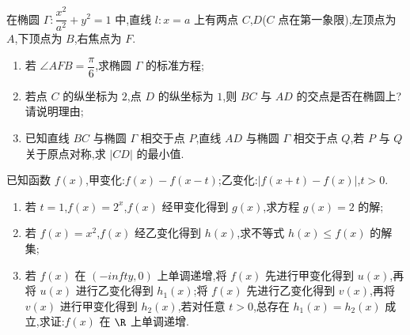 \begin{problem}
在椭圆 \(\Gamma:\dfrac{x^2}{a^2}+y^2=1\) 中,直线 \(l:x=a\) 上有两点 \(C\),\(D\)(\(C\) 点在第一象限),左顶点为 \(A\),下顶点为 \(B\),右焦点为 \(F\).

\begin{enumerate}
\item 若 \(\angle AFB=\dfrac\pi6\),求椭圆 \(\Gamma\) 的标准方程;
\item 若点 \(C\) 的纵坐标为 \(2\),点 \(D\) 的纵坐标为 \(1\),则 \(BC\) 与 \(AD\) 的交点是否在椭圆上?请说明理由;
\item 已知直线 \(BC\) 与椭圆 \(\Gamma\) 相交于点 \(P\),直线 \(AD\) 与椭圆 \(\Gamma\) 相交于点 \(Q\),若 \(P\) 与 \(Q\) 关于原点对称,求 \(\lvert CD\rvert\) 的最小值.
\end{enumerate}
\end{problem}

\begin{problem}
已知函数 \(f(x)\),甲变化:\(f(x)-f(x-t)\);乙变化:\(\lvert f(x+t)-f(x)\rvert\),\(t>0\).

\begin{enumerate}
\item 若 \(t=1\),\(f(x)=2^x\),\(f(x)\) 经甲变化得到 \(g(x)\),求方程 \(g(x)=2\) 的解;
\item 若 \(f(x)=x^2\),\(f(x)\) 经乙变化得到 \(h(x)\),求不等式 \(h(x)\le f(x)\) 的解集;
\item 若 \(f(x)\) 在 \((-infty,0)\) 上单调递增,将 \(f(x)\) 先进行甲变化得到 \(u(x)\),再将 \(u(x)\) 进行乙变化得到 \(h_1(x)\);将 \(f(x)\) 先进行乙变化得到 \(v(x)\),再将 \(v(x)\) 进行甲变化得到 \(h_2(x)\),若对任意 \(t>0\),总存在 \(h_1(x)=h_2(x)\) 成立,求证:\(f(x)\) 在 \(\R\) 上单调递增.
\end{enumerate}
\end{problem}

